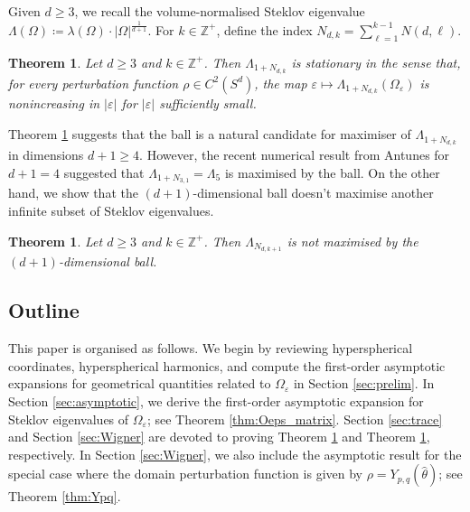 \documentclass[11pt]{amsart}
\theoremstyle{definition}
\theoremstyle{plain}
\newtheorem{theorem}[definition]{Theorem}
\theoremstyle{remark}
\newcommand{\Z}{\mathbb{Z}}
\newcommand{\vareps}{\varepsilon}
\newcommand{\abs}[1]{\lvert{#1}\rvert}
\begin{document}
Given $d\ge 3$, we recall the volume-normalised Steklov eigenvalue $\Lambda(\Omega)\coloneqq \lambda(\Omega)\cdot\abs{\Omega}^{\frac{1}{d + 1}}$. For $k\in\Z^+$, define the index $N_{d, k} = \sum_{\ell = 1}^{k - 1} N(d, \ell)$. 

\begin{theorem} \label{thm:Iso_stat} 
Let $d\ge 3$ and $k\in\Z^+$. Then $\Lambda_{1 + N_{d, k}}$ is stationary in the sense that, for every perturbation function $\rho\in C^2(S^d)$, the map $\vareps\mapsto \Lambda_{1 + N_{d, k}}(\Omega_\vareps)$ is nonincreasing in $\abs{\vareps}$ for $\abs{\vareps}$ sufficiently small. 
\end{theorem} 

Theorem \ref{thm:Iso_stat} suggests that the ball is a natural candidate for maximiser of $\Lambda_{1 + N_{d, k}}$ in dimensions $d + 1\ge 4$. However, the recent numerical result from Antunes for $d + 1 = 4$ suggested that $\Lambda_{1 + N_{3, 1}} = \Lambda_5$ is maximised by the ball. On the other hand, we show that the $(d + 1)$-dimensional ball doesn't maximise another infinite subset of Steklov eigenvalues. 

\begin{theorem} \label{thm:Iso_notball} 
Let $d\ge 3$ and $k\in\Z^+$. Then $\Lambda_{N_{d, k + 1}}$ is not maximised by the $(d + 1)$-dimensional ball. 
\end{theorem} 


\subsection{Outline} 
This paper is organised as follows. We begin by reviewing hyperspherical coordinates, hyperspherical harmonics, and compute the first-order asymptotic expansions for geometrical quantities related to $\Omega_\vareps$ in Section \ref{sec:prelim}. In Section \ref{sec:asymptotic}, we derive the first-order asymptotic expansion for Steklov eigenvalues of $\Omega_\vareps$; see Theorem \ref{thm:Oeps_matrix}. Section \ref{sec:trace} and Section \ref{sec:Wigner} are devoted to proving Theorem \ref{thm:Iso_stat} and Theorem \ref{thm:Iso_notball}, respectively. In Section \ref{sec:Wigner}, we also include the asymptotic result for the special case where the domain perturbation function is given by $\rho = Y_{p, q}(\hat\theta)$; see Theorem \ref{thm:Ypq}. 



\end{document}
